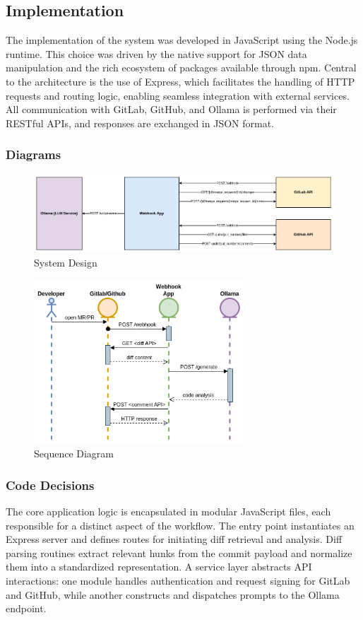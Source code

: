 \documentclass[12pt]{article}
\begin{document}
\subsection{Implementation}
The implementation of the system was developed in JavaScript using the Node.js runtime. This choice was driven by the native support for JSON data manipulation and the rich ecosystem of packages available through npm. Central to the architecture is the use of Express, which facilitates the handling of HTTP requests and routing logic, enabling seamless integration with external services. All communication with GitLab, GitHub, and Ollama is performed via their RESTful APIs, and responses are exchanged in JSON format.

\subsubsection{Diagrams}
\begin{figure}[htbp]
    \centering
    \includegraphics[width=1\textwidth]{systemdesign.png}
    \caption{System Design}
    \label{fig:systemdesign}
\end{figure}

\begin{figure}[htbp]
    \centering
    \includegraphics[width=0.7\textwidth]{sequence.png}
    \caption{Sequence Diagram}
    \label{fig:sequence}
\end{figure}

\subsubsection{Code Decisions}
The core application logic is encapsulated in modular JavaScript files, each responsible for a distinct aspect of the workflow. The entry point instantiates an Express server and defines routes for initiating diff retrieval and analysis. Diff parsing routines extract relevant hunks from the commit payload and normalize them into a standardized representation. A service layer abstracts API interactions: one module handles authentication and request signing for GitLab and GitHub, while another constructs and dispatches prompts to the Ollama endpoint. 
\end{document}
